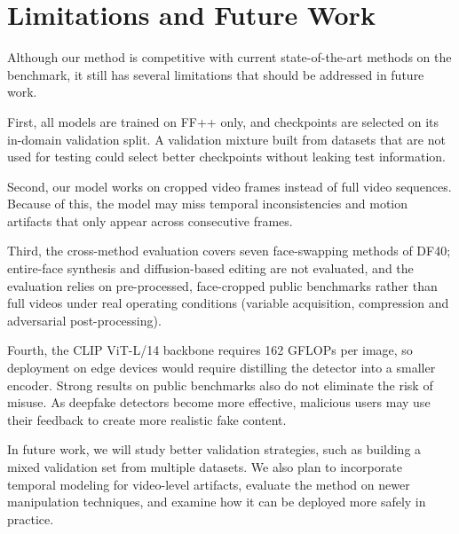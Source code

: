 \documentclass[fonts]{icst}
\newif\ifrevmark\revmarkfalse
\newcommand{\rev}[1]{\ifrevmark{\color{revblue}#1}\else#1\fi}
\begin{document}
\section{Limitations and Future Work}
\label{sec:limits}
Although our method \rev{is competitive with} current state-of-the-art methods on the benchmark, it still has several limitations that should be addressed in future work.

\rev{First, all models are trained on FF++ only, and checkpoints are selected on its in-domain validation split. A validation mixture built from datasets that are not used for testing could select better checkpoints without leaking test information.}

Second, our model works on cropped video frames instead of full video sequences.
Because of this, the model may miss temporal inconsistencies and motion artifacts that only appear across consecutive frames.

\rev{Third, the cross-method evaluation covers seven face-swapping methods of DF40; entire-face synthesis and diffusion-based editing are not evaluated, and the evaluation relies on pre-processed, face-cropped public benchmarks rather than full videos under real operating conditions (variable acquisition, compression and adversarial post-processing).}

\rev{Fourth, the CLIP ViT-L/14 backbone requires 162 GFLOPs per image, so deployment on edge devices would require distilling the detector into a smaller encoder.} Strong results on public benchmarks also do not eliminate the risk of misuse. As deepfake detectors become more effective, malicious users may use their feedback to create more realistic fake content.

In future work, we will study better validation strategies, such as building a mixed validation set from multiple datasets. We also plan to incorporate temporal modeling for video-level artifacts, evaluate the method on newer manipulation techniques, and examine how it can be deployed more safely in practice.
\end{document}
